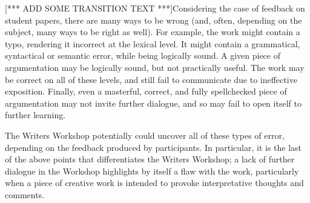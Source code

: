 [*** ADD SOME TRANSITION TEXT ***]Considering the case of feedback on student papers, there are many ways to be wrong (and, often, depending on the subject, many ways to be right as well).  
For example, the work might contain a typo, rendering it incorrect at the lexical level.  It might contain a grammatical, syntactical or semantic error, while being logically sound.  A given piece of argumentation may be logically sound, but not practically useful.   The work may be correct on all of these levels, and still fail to communicate due to ineffective exposition.  Finally, even a masterful, correct, and fully spellchecked piece of argumentation may not invite further dialogue, and so may fail to open itself to further learning.

The Writers Workshop potentially could uncover all of these types of error, depending on the feedback produced by participants. In particular, it is the last of the above points that differentiates the Writers Workshop; a lack of further dialogue in the Workshop highlights by itself a flaw with the work, particularly when a piece of creative work is intended to provoke interpretative thoughts and comments. 



